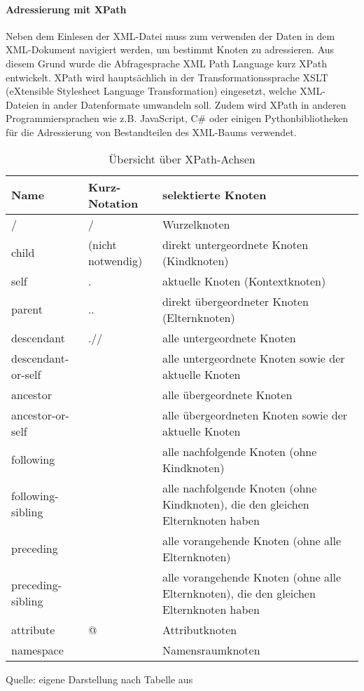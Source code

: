 \paragraph{Adressierung mit XPath}

Neben dem Einlesen der XML-Datei muss zum verwenden der Daten in dem XML-Dokument navigiert werden, um bestimmt Knoten zu adressieren.
Aus diesem Grund wurde die Abfragesprache XML Path Language kurz XPath entwickelt.
XPath wird hauptsächlich in der Transformationssprache XSLT (eXtensible Stylesheet Language Transformation) eingesetzt, welche XML-Dateien in ander Datenformate umwandeln soll.
Zudem wird XPath in anderen Programmiersprachen wie z.B. JavaScript, C# oder einigen Pythonbibliotheken für die Adressierung von Bestandteilen des XML-Baums verwendet.



\begin{table}
    \centering
    \begin{tabular}{lll}
        \toprule
        \textbf{Name} & \textbf{Kurz-Notation} & \textbf{selektierte Knoten} \\
        \midrule
        / & / & Wurzelknoten \\
        child & (nicht notwendig) & direkt untergeordnete
  Knoten (Kindknoten) \\
        self & . & aktuelle Knoten
  (Kontextknoten) \\
        parent & .. & direkt übergeordneter
  Knoten (Elternknoten) \\
        descendant & .// & alle untergeordnete
  Knoten \\
        descendant-or-self &   & alle untergeordnete
  Knoten sowie der aktuelle Knoten \\
        ancestor &   & alle übergeordnete
  Knoten \\
        ancestor-or-self &   & alle übergeordneten
  Knoten sowie der aktuelle Knoten \\
        following &   & alle nachfolgende
  Knoten (ohne Kindknoten) \\
        following-sibling &   & alle nachfolgende
  Knoten (ohne Kindknoten), die den gleichen Elternknoten haben \\
        preceding &   & alle vorangehende
  Knoten (ohne alle Elternknoten) \\
        preceding-sibling &   & alle vorangehende
  Knoten (ohne alle Elternknoten), die den gleichen Elternknoten haben \\
        attribute & @ & Attributknoten \\
        namespace &   & Namensraumknoten \\
        \bottomrule
    \end{tabular}
    \caption{Übersicht über XPath-Achsen}
    \label{tab: Übersicht über XPath-Achsen}
        {Quelle: eigene Darstellung nach Tabelle aus \cite*{XPath2025}}
\end{table}

